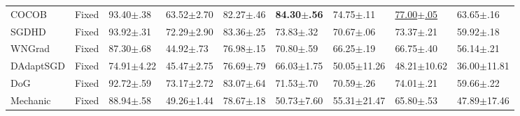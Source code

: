 \begin{tabular}{lllllllll}
    COCOB                    & Fixed      & 93.40$\pm$.38              & 63.52$\pm$2.70          & 82.27$\pm$.46           & \bfseries 84.30$\pm$.56 & 74.75$\pm$.11   & \underline{77.00$\pm$.05} & 63.65$\pm$.16             \\
    SGDHD                    & Fixed      & 93.92$\pm$.31              & 72.29$\pm$2.90          & 83.36$\pm$.25           & 73.83$\pm$.32           & 70.67$\pm$.06   & 73.37$\pm$.21             & 59.92$\pm$.18             \\
    WNGrad                   & Fixed      & 87.30$\pm$.68              & 44.92$\pm$.73           & 76.98$\pm$.15           & 70.80$\pm$.59           & 66.25$\pm$.19   & 66.75$\pm$.40             & 56.14$\pm$.21             \\
    DAdaptSGD                & Fixed      & 74.91$\pm$4.22             & 45.47$\pm$2.75          & 76.69$\pm$.79           & 66.03$\pm$1.75          & 50.05$\pm$11.26 & 48.21$\pm$10.62           & 36.00$\pm$11.81           \\
    DoG                      & Fixed      & 92.72$\pm$.59              & 73.17$\pm$2.72          & 83.07$\pm$.64           & 71.53$\pm$.70           & 70.59$\pm$.26   & 74.01$\pm$.21             & 59.66$\pm$.22             \\
    Mechanic                 & Fixed      & 88.94$\pm$.58              & 49.26$\pm$1.44          & 78.67$\pm$.18           & 50.73$\pm$7.60          & 55.31$\pm$21.47 & 65.80$\pm$.53             & 47.89$\pm$17.46           \\
    \bottomrule
\end{tabular}
